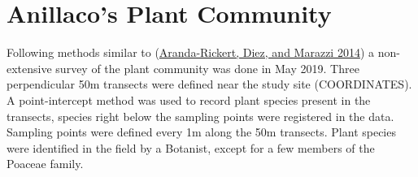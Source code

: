 \documentclass[msc,numbers,hidelinks]{coppe}
\begin{document}
  \hypertarget{anillacos-plant-community}{%
  \section{Anillaco's Plant Community}\label{anillacos-plant-community}}

  Following methods similar to (\protect\hyperlink{ref-aranda-rickert2014}{Aranda-Rickert, Diez, and Marazzi 2014}) a non-extensive survey of the plant community was done in May 2019. Three perpendicular 50m transects were defined near the study site (COORDINATES). A point-intercept method was used to record plant species present in the transects, species right below the sampling points were registered in the data. Sampling points were defined every 1m along the 50m transects. Plant species were identified in the field by a Botanist, except for a few members of the Poaceae family.
\end{document}
